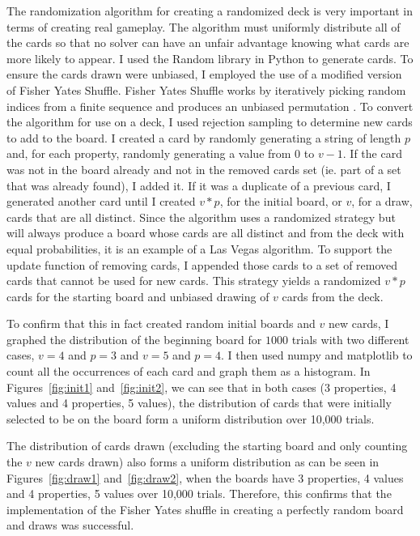 \documentclass[pageno]{jpaper}
\begin{document}
The randomization algorithm for creating a randomized deck is very important in terms of creating real gameplay. The algorithm must uniformly distribute all of the cards so that no solver can have an unfair advantage knowing what cards are more likely to appear. I used the Random library in Python to generate cards. To ensure the cards drawn were unbiased, I employed the use of a modified version of Fisher Yates Shuffle. Fisher Yates Shuffle works by iteratively picking random indices from a finite sequence and produces an unbiased permutation \cite{fisher}. To convert the algorithm for use on a deck, I used rejection sampling to determine new cards to add to the board. I created a card by randomly generating a string of length $p$ and, for each property, randomly generating a value from $0$ to $v-1$. If the card was not in the board already and not in the removed cards set (ie. part of a set that was already found), I added it. If it was a duplicate of a previous card, I generated another card until I created $v*p$, for the initial board, or $v$, for a draw, cards that are all distinct. Since the algorithm uses a randomized strategy but will always produce a board whose cards are all distinct and from the deck with equal probabilities, it is an example of a Las Vegas algorithm. To support the update function of removing cards, I appended those cards to a set of removed cards that cannot be used for new cards. This strategy yields a randomized $v*p$ cards for the starting board and unbiased drawing of $v$ cards from the deck.

To confirm that this in fact created random initial boards and $v$ new cards, I graphed the distribution of the beginning board for $1000$ trials with two different cases, $v=4$ and $p=3$ and $v=5$ and $p=4$. I then used numpy and matplotlib to count all the occurrences of each card and graph them as a histogram. In Figures~\ref{fig:init1}  and~\ref{fig:init2}, we can see that in both cases (3 properties, 4 values and 4 properties, 5 values), the distribution of cards that were initially selected to be on the board form a uniform distribution over 10,000 trials.

The distribution of cards drawn (excluding the starting board and only counting the $v$ new cards drawn) also forms a uniform distribution as can be seen in Figures~\ref{fig:draw1}  and~\ref{fig:draw2}, when the boards have 3 properties, 4 values and 4 properties, 5 values over 10,000 trials. Therefore, this confirms that the implementation of the Fisher Yates shuffle in creating a perfectly random board and draws was successful. 
\end{document}
